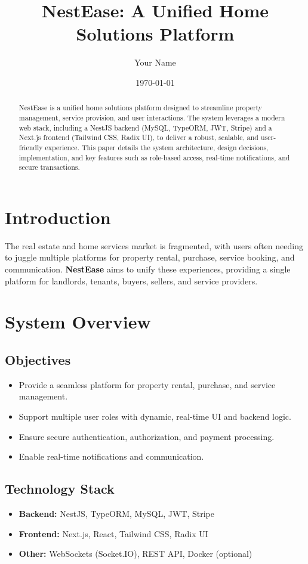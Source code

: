 \documentclass[12pt]{article}
\title{NestEase: A Unified Home Solutions Platform}
\author{Your Name}
\date{\today}
\begin{document}
\maketitle

\begin{abstract}
NestEase is a unified home solutions platform designed to streamline property management, service provision, and user interactions. The system leverages a modern web stack, including a NestJS backend (MySQL, TypeORM, JWT, Stripe) and a Next.js frontend (Tailwind CSS, Radix UI), to deliver a robust, scalable, and user-friendly experience. This paper details the system architecture, design decisions, implementation, and key features such as role-based access, real-time notifications, and secure transactions.
\end{abstract}

\tableofcontents
\newpage

\section{Introduction}
The real estate and home services market is fragmented, with users often needing to juggle multiple platforms for property rental, purchase, service booking, and communication. \textbf{NestEase} aims to unify these experiences, providing a single platform for landlords, tenants, buyers, sellers, and service providers.

\section{System Overview}
\subsection{Objectives}
\begin{itemize}
    \item Provide a seamless platform for property rental, purchase, and service management.
    \item Support multiple user roles with dynamic, real-time UI and backend logic.
    \item Ensure secure authentication, authorization, and payment processing.
    \item Enable real-time notifications and communication.
\end{itemize}

\subsection{Technology Stack}
\begin{itemize}
    \item \textbf{Backend:} NestJS, TypeORM, MySQL, JWT, Stripe
    \item \textbf{Frontend:} Next.js, React, Tailwind CSS, Radix UI
    \item \textbf{Other:} WebSockets (Socket.IO), REST API, Docker (optional)
\end{itemize}
\end{document}
